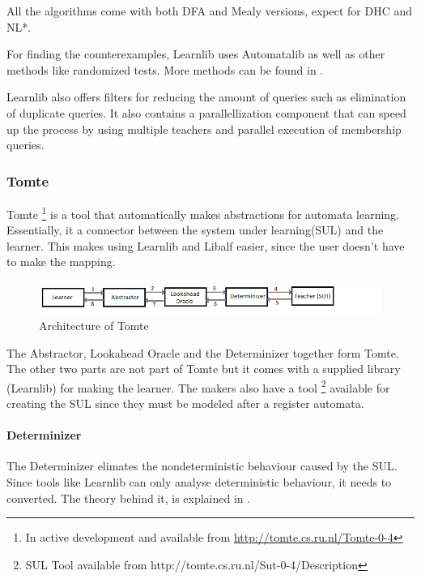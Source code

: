 \documentclass[multi,crop=false,class=article]{standalone}
\begin{document}
All the algorithms come with both DFA and Mealy versions, expect for DHC and NL*.

For finding the counterexamples, Learnlib uses Automatalib as well as other 
methods like randomized tests. More methods can be found in \cite{Isberner2015}.

Learnlib also offers filters for reducing the amount of queries such as 
elimination of duplicate queries. %
It also contains a parallellization component that can speed up the process by 
using multiple teachers and parallel execution of membership 
queries\cite{Henrix15}\cite{Howar2012}. 

\subsubsection{Tomte}
\label{sssec:tomte}
Tomte \footnote{In active development and available from 
\url{http://tomte.cs.ru.nl/Tomte-0-4}} is a tool that automatically makes 
abstractions for automata learning. Essentially, it a connector between the 
system under learning(SUL) and the learner. This makes using Learnlib and 
Libalf easier, since the user doesn't have to make the mapping.

\begin{figure}[!ht]
	\includegraphics[width=\textwidth]{Tool_images/tomte_network.png}
	\caption{Architecture of Tomte}
	\label{fig:tomte_arch_interactoin}
\end{figure}

The Abstractor, Lookahead Oracle and the Determinizer together form Tomte. The 
other two parts are not part of Tomte but it comes with a supplied library 
(Learnlib) for making the learner.
The makers also have a tool \footnote{SUL Tool available from 
http://tomte.cs.ru.nl/Sut-0-4/Description} available for creating the SUL since 
they must be modeled after a register automata.
 
\paragraph{Determinizer}
The Determinizer elimates the nondeterministic behaviour caused by the SUL. 
Since tools like Learnlib can only analyse deterministic behaviour, it needs to 
converted. The theory behind it, is explained in \cite{Aarts2015}.
\end{document}
